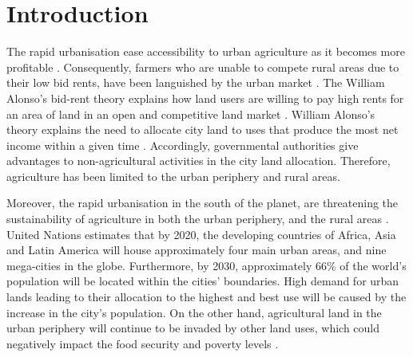 \chapter{Introduction} %

\label{Chapter:Introduction}

The rapid urbanisation ease accessibility to urban agriculture as it becomes more profitable \cite{Trussell2010}. Consequently, farmers who are unable to compete rural areas due to their low bid rents, have been languished by the urban market \cite{Amponsah2015, Amponsah2016, Keraita2008, Owusu2012}. The William Alonso's bid-rent theory explains how land users are willing to pay high rents for an area of land in an open and competitive land market \cite{Scholz1933, Barkley1986, Fisher1954}. William Alonso's theory explains the need to allocate city land to uses that produce the most net income within a given time \cite{Fisher1954}. Accordingly, governmental authorities give advantages to non-agricultural activities in the city land allocation. Therefore, agriculture has been limited to the urban periphery and rural areas.

Moreover, the rapid urbanisation in the south of the planet, are threatening the sustainability of agriculture in both the urban periphery, and the rural areas \cite{Amponsah2015, Liu2017}. United Nations estimates that by 2020, the developing countries of Africa, Asia and Latin America will house approximately four main urban areas, and nine mega-cities in the globe. Furthermore, by 2030, approximately 66\% of the world's population will be located within the cities' boundaries. High demand for urban lands leading to their allocation to the highest and best use will be caused by the increase in the city's population. On the other hand, agricultural land in the urban periphery will continue to be invaded by other land uses, which could negatively impact the food security and poverty levels \cite{Hoornweg2012}.

